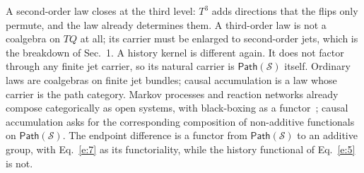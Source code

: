 \documentclass[10pt]{article}
\newcommand{\Path}{\mathsf{Path}}
\begin{document}
A second-order law closes at the third level: $T^3$ adds directions that the flips only permute, and the law already determines them. A third-order law is not a coalgebra on $TQ$ at all; its carrier must be enlarged to second-order jets, which is the breakdown of Sec.~1. A history kernel is different again. It does not factor through any finite jet carrier, so its natural carrier is $\Path(\mathcal S)$ itself. Ordinary laws are coalgebras on finite jet bundles; causal accumulation is a law whose carrier is the path category. Markov processes and reaction networks already compose categorically as open systems, with black-boxing as a functor~\cite{baezfongpollard,fongspivak,baezpollardrn,hornjackson}; causal accumulation asks for the corresponding composition of non-additive functionals on $\Path(\mathcal S)$. The endpoint difference is a functor from $\Path(\mathcal S)$ to an additive group, with Eq.~\eqref{e:7} as its functoriality, while the history functional of Eq.~\eqref{e:5} is not.
\end{document}
